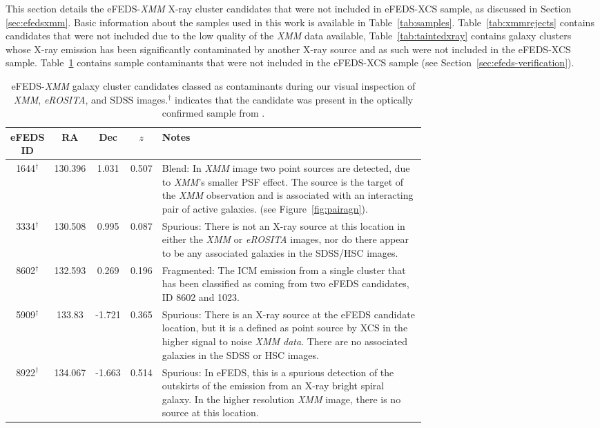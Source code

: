 \documentclass[fleqn,usenatbib]{mnras}
\begin{document}
This section details the eFEDS-{\em XMM} X-ray cluster candidates that were not included in eFEDS-XCS sample, as discussed in Section \ref{sec:efedsxmm}. Basic information about the samples used in this work is available in Table~\ref{tab:samples}. Table~\ref{tab:xmmrejects} contains candidates that were not included due to the low quality of the {\em XMM} data available, Table~\ref{tab:taintedxray} contains galaxy clusters whose X-ray emission has been significantly contaminated by another X-ray source and as such were not included in the eFEDS-XCS sample. Table~\ref{tab:rejects} contains sample contaminants that were not included in the eFEDS-XCS sample (see Section~\ref{sec:efeds-verification}).

\begin{table}
\begin{center}
\caption[]{{eFEDS-{\em XMM} galaxy cluster candidates classed as contaminants during our visual inspection of {\em XMM}, {\em eROSITA}, and SDSS images.\newline $^\dagger$ indicates that the candidate was present in the optically confirmed sample from \cite{efedsclusteropticalcat}.}\label{tab:rejects}}
\vspace{-5mm}
\begin{tabular}{cccc|p{0.70\linewidth}}
\hline
\hline
eFEDS ID & RA & Dec & $z$ &  Notes\\
\hline
\hline
1644$^\dagger$ & 130.396 & 1.031 & 0.507 & Blend: In {\em XMM} image two point sources are detected, due to {\em XMM}'s smaller PSF effect. The source is the target of the {\em XMM} observation and is associated with an interacting pair of active galaxies. (see Figure~\ref{fig:pairagn}).\\ 
\hline
3334$^\dagger$ & 130.508 & 0.995 & 0.087 & Spurious: There is not an X-ray source at this location in either the {\em XMM} or {\em eROSITA} images, nor do there appear to be any associated galaxies in the SDSS/HSC images. \\ 
\hline
8602$^\dagger$ & 132.593 & 0.269 & 0.196 & Fragmented: The ICM emission from a single cluster that has been classified as coming from two eFEDS candidates, ID 8602 and 1023. \\ 
\hline
5909$^\dagger$ & 133.83 & -1.721 & 0.365 & Spurious: There is an X-ray source at the eFEDS candidate location, but it is a defined as point source by XCS in the higher signal to noise {\em XMM data}. There are no associated galaxies in the SDSS or HSC images. \\ 
\hline
8922$^\dagger$ & 134.067 & -1.663 & 0.514 & Spurious: In eFEDS, this is a spurious detection of the outskirts of the emission from an X-ray bright spiral galaxy. In the higher resolution {\em XMM} image, there is no source at this location.\\ 

\end{tabular}
\end{center}
\end{table}
\end{document}
